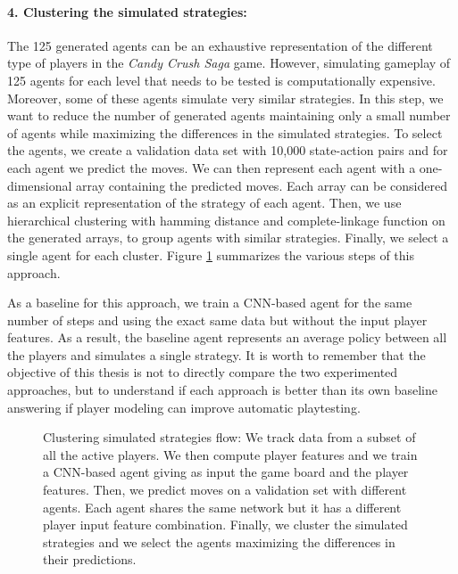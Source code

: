 \paragraph{4. Clustering the simulated strategies:}
The 125 generated agents can be an exhaustive representation of the different type of players in the \textit{Candy Crush Saga} game. However, simulating gameplay of 125 agents for each level that needs to be tested is computationally expensive. Moreover, some of these agents simulate very similar strategies. In this step, we want to reduce the number of generated agents maintaining only a small number of agents while maximizing the differences in the simulated strategies. To select the agents, we create a validation data set with 10,000 state-action pairs and for each agent we predict the moves. We can then represent each agent with a one-dimensional array containing the predicted moves. Each array can be considered as an explicit representation of the strategy of each agent. Then, we use hierarchical clustering with hamming distance and complete-linkage function on the generated arrays, to group agents with similar strategies. Finally, we select a single agent for each cluster. Figure \ref{fig:clustering_simulated_strategies_flow} summarizes the various steps of this approach. 

As a baseline for this approach, we train a \acs{CNN}-based agent for the same number of steps and using the exact same data but without the input player features. As a result, the baseline agent represents an average policy between all the players and simulates a single strategy. It is worth to remember that the objective of this thesis is not to directly compare the two experimented approaches, but to understand if each approach is better than its own baseline answering if player modeling can improve automatic playtesting.
 

\begin{figure}[ht!]
    \centering
    
    \caption{Clustering simulated strategies flow: We track data from a subset of all the active players. We then compute player features and we train a \acs{CNN}-based agent giving as input the game board and the player features. Then, we predict moves on a validation set with different agents. Each agent shares the same network but it has a different player input feature combination. Finally, we cluster the simulated strategies and we select the agents maximizing the differences in their predictions.}
    \label{fig:clustering_simulated_strategies_flow}
\end{figure}



